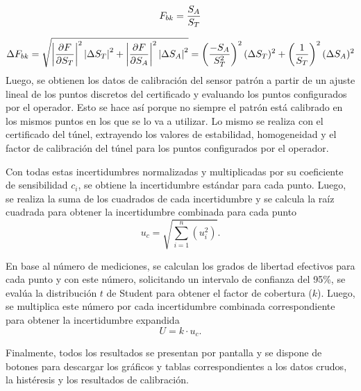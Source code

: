 \begin{equation}
    \centering
    F_{bk}= \frac{S_{A} }{S_{T}}
    \label{eq:FactorDeBloqueo}
\end{equation}

\begin{equation}
    \centering
    \Delta F_{bk} =  \sqrt{\left\lvert \frac{\partial F}{\partial S_T} \right\rvert^2 \left\lvert\Delta S_T\right\rvert^2 + \left\lvert \frac{\partial F}{\partial S_A} \right\rvert^2 \left\lvert\Delta S_A\right\rvert^2} = \left( \frac{-S_{A}}{S_{T}^{2}} \right)^2 (\Delta S_T)^2 + \left( \frac{1}{S_{T}} \right)^2 (\Delta S_A)^2
    \label{eq:incertiFactorBloqueo}
\end{equation}
Luego, se obtienen los datos de calibración del sensor patrón a partir de un ajuste lineal de los puntos discretos del certificado y evaluando los puntos configurados por el operador. Esto se hace así porque no siempre el patrón está calibrado en los mismos puntos en los que se lo va a utilizar. Lo mismo se realiza con el certificado del túnel, extrayendo los valores de estabilidad, homogeneidad y el factor de calibración del túnel para los puntos configurados por el operador.

Con todas estas incertidumbres normalizadas y multiplicadas por su coeficiente de sensibilidad $c_{i}$, se obtiene la incertidumbre estándar para cada punto. Luego, se realiza la suma de los cuadrados de cada incertidumbre y se calcula la raíz cuadrada para obtener la incertidumbre combinada para cada punto
\[
u_c = \sqrt{\sum_{i=1}^{n} (u_i^2)}.
\]

En base al número de mediciones, se calculan los grados de libertad efectivos para cada punto y con este número, solicitando un intervalo de confianza del 95\%, se evalúa la distribución $t$ de Student para obtener el factor de cobertura ($k$). Luego, se multiplica este número por cada incertidumbre combinada correspondiente para obtener la incertidumbre expandida 
\[
U = k \cdot u_c.
\]

Finalmente, todos los resultados se presentan por pantalla y se dispone de botones para descargar los gráficos y tablas correspondientes a los datos crudos, la histéresis y los resultados de calibración.



